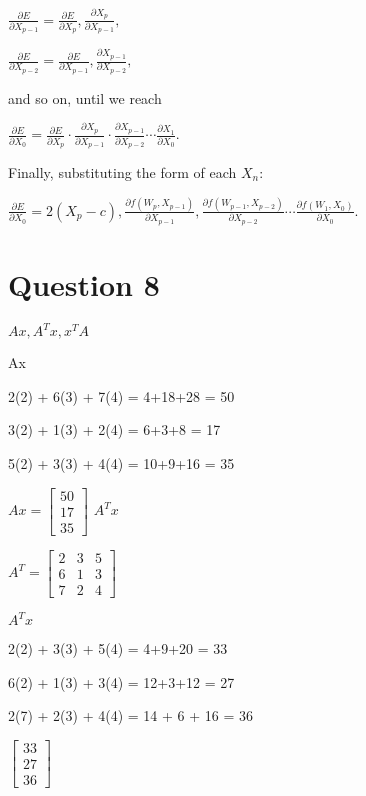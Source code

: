 \documentclass[12pt]{article}
\begin{document}
$\frac{\partial E}{\partial X_{p-1}} = \frac{\partial E}{\partial X_p},\frac{\partial X_p}{\partial X_{p-1}},$


$\frac{\partial E}{\partial X_{p-2}} = \frac{\partial E}{\partial X_{p-1}},\frac{\partial X_{p-1}}{\partial X_{p-2}},$


and so on, until we reach


$\frac{\partial E}{\partial X_0} = \frac{\partial E}{\partial X_p}\cdot \frac{\partial X_p}{\partial X_{p-1}}\cdot \frac{\partial X_{p-1}}{\partial X_{p-2}}\cdots\frac{\partial X_1}{\partial X_0}.$

Finally, substituting the form of each $X_n$:


$\frac{\partial E}{\partial X_0} = 2(X_p - c),\frac{\partial f(W_p, X_{p-1})}{\partial X_{p-1}},\frac{\partial f(W_{p-1}, X_{p-2})}{\partial X_{p-2}}\cdots\frac{\partial f(W_1, X_0)}{\partial X_0}.$
\vspace{10cm}

\newpage

\section*{Question 8} 
$Ax, A^Tx, x^TA$

\vspace{0.5cm}
Ax 

2(2) + 6(3) + 7(4) = 4+18+28 = 50

3(2) + 1(3) + 2(4) = 6+3+8 = 17

5(2) + 3(3) + 4(4) = 10+9+16 = 35

$Ax = \begin{bmatrix}
    50 \\ 17 \\ 35
\end{bmatrix}


$
$A^Tx$

$
A^T = \begin{bmatrix}
    2 & 3 & 5\\6 & 1 & 3 \\ 7&2&4
\end{bmatrix}$

\vspace{0.5cm}
$A^Tx $

2(2) + 3(3) + 5(4) = 4+9+20 = 33

6(2) + 1(3) + 3(4) = 12+3+12 = 27

2(7) + 2(3) + 4(4) = 14 + 6 + 16 = 36

$\begin{bmatrix}
    33  \\ 27 \\ 36
\end{bmatrix}
$
\end{document}
